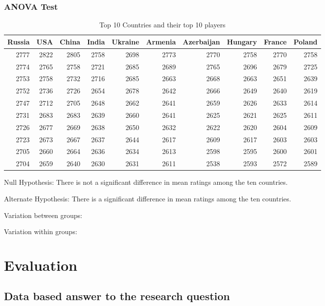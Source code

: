 \documentclass[12pt]{article}
\begin{document}
\subsubsection{ANOVA Test}
\begin{table}
\begin{center}
\begin{tabular}{rrrrrrrrrr}
Russia & USA & China & India & Ukraine & Armenia & Azerbaijan & Hungary & France & Poland\\
\hline
2777 & 2822 & 2805 & 2758 & 2698 & 2773 & 2770 & 2758 & 2770 & 2758\\
2774 & 2765 & 2758 & 2721 & 2685 & 2689 & 2765 & 2696 & 2679 & 2725\\
2753 & 2758 & 2732 & 2716 & 2685 & 2663 & 2668 & 2663 & 2651 & 2639\\
2752 & 2736 & 2726 & 2654 & 2678 & 2642 & 2666 & 2649 & 2640 & 2619\\
2747 & 2712 & 2705 & 2648 & 2662 & 2641 & 2659 & 2626 & 2633 & 2614\\
2731 & 2683 & 2683 & 2639 & 2660 & 2641 & 2625 & 2621 & 2625 & 2611\\
2726 & 2677 & 2669 & 2638 & 2650 & 2632 & 2622 & 2620 & 2604 & 2609\\
2723 & 2673 & 2667 & 2637 & 2644 & 2617 & 2609 & 2617 & 2603 & 2603\\
2705 & 2660 & 2664 & 2636 & 2634 & 2613 & 2598 & 2595 & 2600 & 2601\\
2704 & 2659 & 2640 & 2630 & 2631 & 2611 & 2538 & 2593 & 2572 & 2589\\
\end{tabular}
    \caption{Top 10 Countries and their top 10 players}
\end{center}
\end{table}

Null Hypothesis: There is not a significant difference in mean ratings among the ten countries. 

Alternate Hypothesis: There is a significant difference in mean ratings among the ten countries. 

Variation between groups:

Variation within groups:


\section{Evaluation}
\subsection{Data based answer to the research question}
\end{document}
